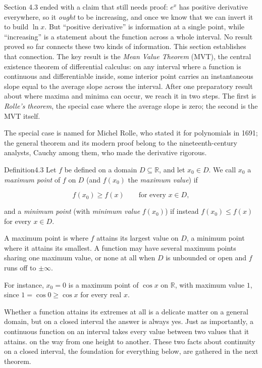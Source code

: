 \documentclass[a4paper,12pt,oneside]{memoir}
\begin{document}
Section 4.3 ended with a claim that still needs proof: \(e^{x}\) has positive derivative everywhere, so it \emph{ought} to be increasing, and once we know that we can invert it to build \(\ln x\). But “positive derivative” is information at a single point, while “increasing” is a statement about the function across a whole interval. No result proved so far connects these two kinds of information. This section establishes that connection. The key result is the \emph{Mean Value Theorem} (MVT), the central existence theorem of differential calculus: on any interval where a function is continuous and differentiable inside, some interior point carries an instantaneous slope equal to the average slope across the interval. After one preparatory result about where maxima and minima can occur, we reach it in two steps. The first is \emph{Rolle’s theorem}, the special case where the average slope is zero; the second is the MVT itself.

The special case is named for Michel Rolle, who stated it for polynomials in 1691; the general theorem and its modern proof belong to the nineteenth-century analysts, Cauchy among them, who made the derivative rigorous.

\begin{envdefinition}{Definition}{4.3}{}
Let \(f\) be defined on a domain \(D \subseteq \mathbb{R}\), and let \(x_{0} \in D\). We call \(x_{0}\) a \emph{maximum point} of \(f\) on \(D\) (and \(f(x_{0})\) the \emph{maximum value}) if

\[ f(x_{0}) \ge f(x) \qquad \text{for every } x \in D, \]

and a \emph{minimum point} (with \emph{minimum value} \(f(x_{0})\)) if instead \(f(x_{0}) \le f(x)\) for every \(x \in D\).

\begin{informal}
A maximum point is where \(f\) attains its largest value on \(D\), a minimum point where it attains its smallest. A function may have several maximum points sharing one maximum value, or none at all when \(D\) is unbounded or open and \(f\) runs off to \(\pm\infty\).
\end{informal}
\end{envdefinition}
For instance, \(x_{0} = 0\) is a maximum point of \(\cos x\) on \(\mathbb{R}\), with maximum value \(1\), since \(1 = \cos 0 \ge \cos x\) for every real \(x\).

Whether a function attains its extremes at all is a delicate matter on a general domain, but on a closed interval the answer is always yes. Just as importantly, a continuous function on an interval takes every value between two values that it attains. on the way from one height to another. These two facts about continuity on a closed interval, the foundation for everything below, are gathered in the next theorem.
\end{document}
